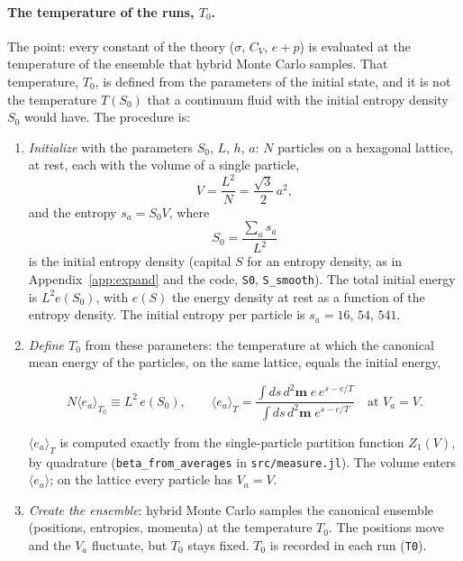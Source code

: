 \documentclass[11pt,aps,preprint,nofootinbib,superscriptaddress,tightenlines]{revtex4-2}
\newcommand{\avg}[1]{\langle #1\rangle}
\def\st{\begin{equation}}
\def\stp{\end{equation}}
\def\App#1{Appendix~\ref{#1}}
\let\oldparagraph\paragraph
\renewcommand{\paragraph}{\par\bigskip\oldparagraph}
\begin{document}
\paragraph{The temperature of the runs, $T_0$.}  The point: every constant of the theory ($\sigma$, $C_V$, $e+p$) is evaluated at the temperature of the
ensemble that hybrid Monte Carlo samples.  That temperature, $T_0$, is defined from the parameters of the initial state, and it is not the temperature
$T(S_0)$ that a continuum fluid with the initial entropy density $S_0$ would have.  The procedure is:
\begin{enumerate}
\item \emph{Initialize} with the parameters $S_0$, $L$, $h$, $a$: $N$ particles on a hexagonal lattice, at rest, each with the volume of a single particle,
  \st
  V=\frac{L^2}N=\frac{\sqrt3}2\,a^2 ,
  \stp
  and the entropy $s_a=S_0V$, where
  \st
  S_0=\frac{\sum_as_a}{L^2}
  \stp
  is the initial entropy density (capital $S$ for an entropy density, as in \App{app:expand} and the code, \texttt{S0}, \texttt{S\_smooth}).  The total initial energy
  is $L^2e(S_0)$, with $e(S)$ the energy density at rest as a function of the entropy density.  The initial entropy per particle is $s_a=16$, $54$, $541$.
\item \emph{Define $T_0$} from these parameters: the temperature at which the canonical mean energy of the particles, on the same lattice, equals the initial energy,
  \begin{keyeq}
  \st
  N\avg{e_a}_{T_0}\equiv L^2\,e(S_0),\qquad \avg{e_a}_T=\frac{\int ds\,d^2\bm m\;e\,e^{s-e/T}}{\int ds\,d^2\bm m\;e^{s-e/T}}\quad\text{at }V_a=V .
  \label{T0def}
  \stp
  \end{keyeq}
  $\avg{e_a}_T$ is computed exactly from the single-particle partition function $Z_1(V)$, by quadrature (\texttt{beta\_from\_averages} in \texttt{src/measure.jl}).
  The volume enters $\avg{e_a}$; on the lattice every particle has $V_a=V$.
\item \emph{Create the ensemble}: hybrid Monte Carlo samples the canonical ensemble (positions, entropies, momenta) at the temperature $T_0$.  The positions
  move and the $V_a$ fluctuate, but $T_0$ stays fixed.  $T_0$ is recorded in each run (\texttt{T0}).
\end{enumerate}
\end{document}
